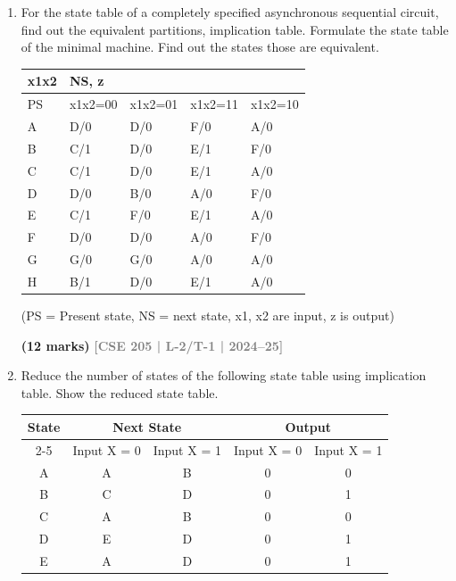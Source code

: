 \documentclass[12pt]{article}
\newcommand{\yr}[1]{\hfill\textcolor{gray}{\small\textbf{[#1]}}}
\newcommand{\mk}[1]{\textcolor{orange!70!black}{\small\textbf{(#1 marks)}}}
\begin{document}
\begin{enumerate}

\item For the state table of a completely specified asynchronous sequential circuit, find out the equivalent partitions, implication table. Formulate the state table of the minimal machine. Find out the states those are equivalent.

\begin{center}
  \begin{tabular}{|l|l|l|l|l|}
\hline
x1x2 & NS, z & & & \\ \hline
PS & x1x2=00 & x1x2=01 & x1x2=11 & x1x2=10 \\ \hline
A & D/0 & D/0 & F/0 & A/0 \\ \hline
B & C/1 & D/0 & E/1 & F/0 \\ \hline
C & C/1 & D/0 & E/1 & A/0 \\ \hline
D & D/0 & B/0 & A/0 & F/0 \\ \hline
E & C/1 & F/0 & E/1 & A/0 \\ \hline
F & D/0 & D/0 & A/0 & F/0 \\ \hline
G & G/0 & G/0 & A/0 & A/0 \\ \hline
H & B/1 & D/0 & E/1 & A/0 \\ \hline
\end{tabular}

\vspace{0.3cm}
(PS = Present state, NS = next state, x1, x2 are input, z is output)
\end{center}

\mk{12} \yr{CSE 205 | L-2/T-1 | 2024--25}




\item Reduce the number of states of the following state table using implication table. Show the reduced state table.

\begin{center}
  \begin{tabular}{|c|c|c|c|c|}
\hline
\multirow{2}{*}{State} & \multicolumn{2}{c|}{Next State} & \multicolumn{2}{c|}{Output} \\ \cline{2-5} 
                       & Input X = 0    & Input X = 1    & Input X = 0  & Input X = 1  \\ \hline
A                      & A              & B              & 0            & 0            \\ \hline
B                      & C              & D              & 0            & 1            \\ \hline
C                      & A              & B              & 0            & 0            \\ \hline
D                      & E              & D              & 0            & 1            \\ \hline
E                      & A              & D              & 0            & 1            \\ \hline
\end{tabular}
\end{center}


\end{enumerate}
\end{document}
